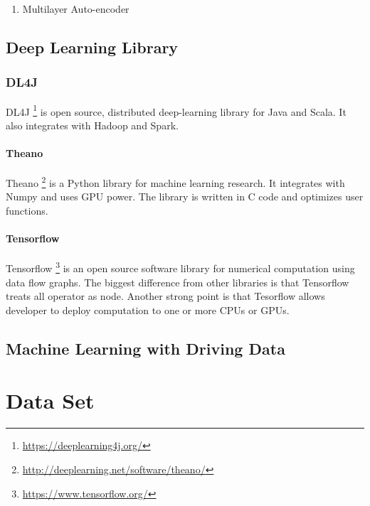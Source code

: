\documentclass[draft,dvipsnames]{drexel-thesis}
\begin{document}
\begin{thesis}
\begin{enumerate}
\item Multilayer Auto-encoder\\

\end{enumerate}

\section{Deep Learning Library}\label{sec:DLL}
\subsection{DL4J}
DL4J \footnote{\url{https://deeplearning4j.org/}} is open source, distributed deep-learning library for Java and Scala. It also integrates with Hadoop and Spark. 

\subsubsection{Theano}
Theano \footnote{\url{http://deeplearning.net/software/theano/}} is a Python library for machine learning research. It integrates with Numpy and uses GPU power. The library is written in C code and optimizes user functions.

\subsubsection{Tensorflow}
Tensorflow \footnote{\url{https://www.tensorflow.org/}} is an open source software library for numerical computation using data flow graphs. The biggest difference from other libraries is that Tensorflow treats all operator as node. Another strong point is that Tesorflow allows developer to deploy computation to one or more CPUs or GPUs. 


\section{Machine Learning with Driving Data}\label{sec:MLDD}

\chapter{Data Set}



\end{thesis}
\end{document}
